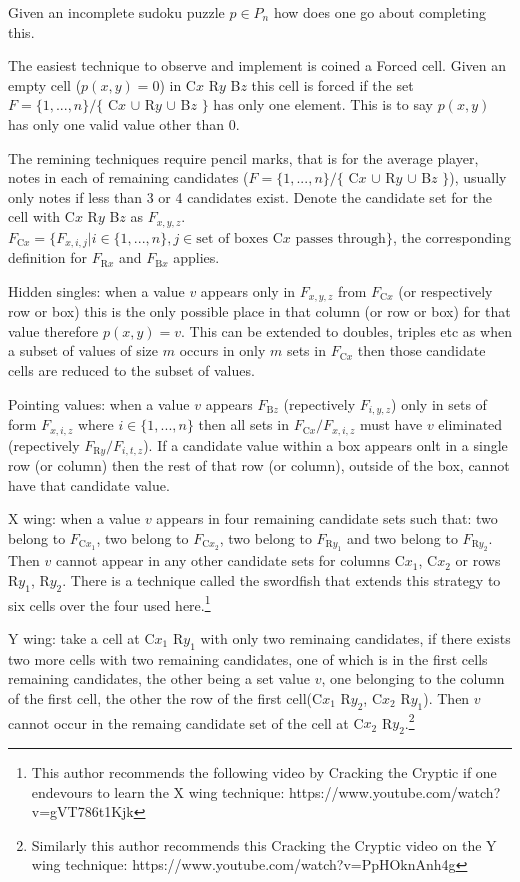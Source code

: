 \documentclass[a4paper,11pt]{report}
\newcounter{row}
\newcounter{col}
\begin{document}
Given an incomplete sudoku puzzle $p\in P_n$ how does one go about completing this.

The easiest technique to observe and implement is coined a Forced cell. Given an empty cell ($p(x,y)=0$) in C$x$ R$y$ B$z$ this cell is forced if the set $F=\{1,...,n\} / \{$ C$x$ $\cup$ R$y$ $\cup$ B$z$ $\}$ has only one element. This is to say $p(x,y)$ has only one valid value other than 0. 

The remining techniques require pencil marks, that is for the average player, notes in each of remaining candidates ($F=\{1,...,n\} / \{$ C$x$ $\cup$ R$y$ $\cup$ B$z$ $\}$), usually only notes if less than 3 or 4 candidates exist. Denote the candidate set for the cell with C$x$ R$y$ B$z$ as $F_{x,y,z}$. $F_{\text{C}x} = \{F_{x,i,j}|i\in\{1,...,n\}, j \in \text{set of boxes C$x$ passes through}\}$, the corresponding definition for $F_{\text{R}x}$ and $F_{\text{B}x}$ applies.

Hidden singles: when a value $v$ appears only in $F_{x,y,z}$ from $F_{\text{C}x}$ (or respectively row or box) this is the only possible place in that column (or row or box) for that value therefore $p(x,y)=v$. This can be extended to doubles, triples etc as when a subset of values of size $m$ occurs in only $m$ sets in $F_{\text{C}x}$ then those candidate cells are reduced to the subset of values.

Pointing values: when a value $v$ appears $F_{\text{B}z}$ (repectively $F_{i,y,z}$) only in sets of form $F_{x,i,z}$  where $i\in \{1,...,n\}$ then all sets in $F_{\text{C}x}/F_{x,i,z}$ must have $v$ eliminated (repectively $F_{\text{R}y}/F_{i,t,z}$). If a candidate value within a box appears onlt in a single row (or column) then the rest of that row (or column), outside of the box, cannot have that candidate value.

X wing: when a value $v$ appears in four remaining candidate sets such that: two belong to $F_{\text{C}x_1}$, two belong to $F_{\text{C}x_2}$, two belong to $F_{\text{R}y_1}$ and two belong to $F_{\text{R}y_2}$. Then $v$ cannot appear in any other candidate sets for columns C$x_1$, C$x_2$ or rows R$y_1$, R$y_2$. There is a technique called the swordfish that extends this strategy to six cells over the four used here.\footnote{This author recommends the following video by Cracking the Cryptic if one endevours to learn the X wing technique: https://www.youtube.com/watch?v=gVT786t1Kjk}

Y wing: take a cell at C$x_1$ R$y_1$ with only two reminaing candidates, if there exists two more cells with two remaining candidates, one of which is in the first cells remaining candidates, the other being a set value $v$, one belonging to the column of the first cell, the other the row of the first cell(C$x_1$ R$y_2$, C$x_2$ R$y_1$). Then $v$ cannot occur in the remaing candidate set of the cell at C$x_2$ R$y_2$.\footnote{Similarly this author recommends this Cracking the Cryptic video on the Y wing technique: https://www.youtube.com/watch?v=PpHOknAnh4g}
\end{document}
